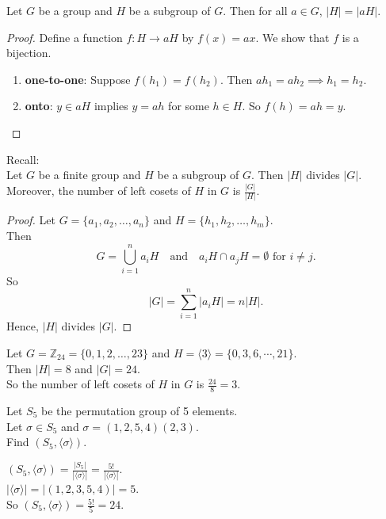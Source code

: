 \begin{theorem}
    Let $G$ be a group and $H$ be a subgroup of $G$. Then for all $a \in G$, $|H| = |aH|$.
\end{theorem}
\begin{proof}
    Define a function $f : H \to aH$ by $f(x) = ax$. We show that $f$ is a bijection.
    \begin{enumerate}
        \item \textbf{one-to-one}: Suppose $f(h_1) = f(h_2)$. Then $ah_1 = ah_2 \implies h_1 = h_2$.
        \item \textbf{onto}: $y \in aH$ implies $y = ah$ for some $h \in H$. So $f(h) = ah = y$.
    \end{enumerate}
\end{proof}

\begin{prev}
    Recall:\\
    Let $G$ be a finite group and $H$ be a subgroup of $G$. Then $|H|$ divides $|G|$.\\
    Moreover, the number of left cosets of $H$ in $G$ is $\frac{|G|}{|H|}$.
\end{prev}
\begin{proof}
Let $G = \{a_1, a_2, \ldots, a_n\}$ and $H = \{h_1, h_2, \ldots, h_m\}$.\\
Then 
\[
G = \bigcup_{i=1}^n a_iH \quad \text{and} \quad a_iH \cap a_jH = \emptyset \text{ for } i \neq j.
\]
So 
\[
|G| = \sum_{i=1}^n |a_iH| = n|H|.
\]
Hence, $|H|$ divides $|G|$.
\end{proof}

\begin{eg}
    Let $G = \mathbb{Z}_{24} = \{0, 1, 2, \ldots, 23\}$ and $H = \langle 3 \rangle = \{0, 3, 6, \cdots, 21\}$.\\
    Then $|H| = 8$ and $|G| = 24$.\\
    So the number of left cosets of $H$ in $G$ is $\frac{24}{8} = 3$.\\
\end{eg}

\begin{exercise}
Let $S_5$ be the permutation group of 5 elements.\\
Let $\sigma \in S_5$ and $\sigma = (1, 2, 5, 4)(2, 3)$.\\
Find $(S_5, \langle \sigma \rangle)$.\\
\end{exercise}
\begin{answer}
    $(S_5, \langle \sigma \rangle) = \frac{|S_5|}{|\langle \sigma \rangle|} = \frac{5!}{|\langle \sigma \rangle|}$.\\
    $|\langle \sigma \rangle| = |(1, 2, 3, 5, 4)| = 5$.\\
    So $(S_5, \langle \sigma \rangle) = \frac{5!}{5} = 24$.\\
\end{answer}

